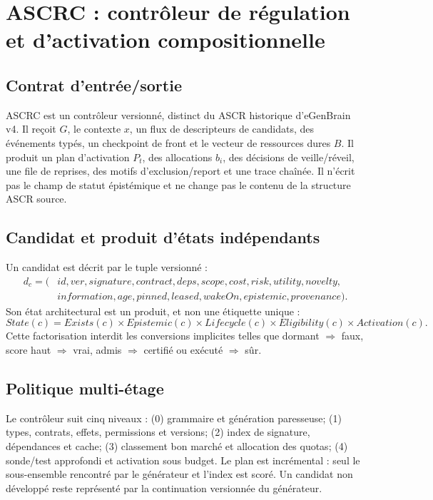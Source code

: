 \section{ASCRC : contrôleur de régulation et d'activation compositionnelle}
\subsection{Contrat d'entrée/sortie}
ASCRC est un contrôleur versionné, distinct du ASCR historique d'eGenBrain v4. Il reçoit $G$, le contexte $x$, un flux de descripteurs de candidats, des événements typés, un checkpoint de front et le vecteur de ressources dures $B$. Il produit un plan d'activation $P_t$, des allocations $b_i$, des décisions de veille/réveil, une file de reprises, des motifs d'exclusion/report et une trace chaînée. Il n'écrit pas le champ de statut épistémique et ne change pas le contenu de la structure ASCR source.

\subsection{Candidat et produit d'états indépendants}
Un candidat est décrit par le tuple versionné :
\[
\begin{aligned}
 d_c=(&id,ver,signature,contract,deps,scope,cost,risk,utility,novelty,\\
      &information,age,pinned,leased,wakeOn,epistemic,provenance).
\end{aligned}
\]
Son état architectural est un produit, et non une étiquette unique :
\[
 State(c)=Exists(c)\times Epistemic(c)\times Lifecycle(c)\times Eligibility(c)\times Activation(c).
\]
Cette factorisation interdit les conversions implicites telles que dormant $\Rightarrow$ faux, score haut $\Rightarrow$ vrai, admis $\Rightarrow$ certifié ou exécuté $\Rightarrow$ sûr.

\subsection{Politique multi-étage}
Le contrôleur suit cinq niveaux : (0) grammaire et génération paresseuse; (1) types, contrats, effets, permissions et versions; (2) index de signature, dépendances et cache; (3) classement bon marché et allocation des quotas; (4) sonde/test approfondi et activation sous budget. Le plan est incrémental : seul le sous-ensemble rencontré par le générateur et l'index est scoré. Un candidat non développé reste représenté par la continuation versionnée du générateur.

